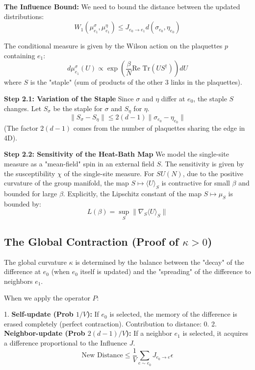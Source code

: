 \textbf{The Influence Bound:}
We need to bound the distance between the updated distributions:
\begin{equation}
W_1(\mu^\sigma_{e_1}, \mu^\eta_{e_1}) \le J_{e_0 \to e_1} d(\sigma_{e_0}, \eta_{e_0})
\end{equation}

The conditional measure is given by the Wilson action on the plaquettes $p$ containing $e_1$:
\begin{equation}
d\mu^\sigma_{e_1}(U) \propto \exp\left( \frac{\beta}{N} \text{Re Tr} (U S^\dagger) \right) dU
\end{equation}
where $S$ is the "staple" (sum of products of the other 3 links in the plaquettes).

\textbf{Step 2.1: Variation of the Staple}
Since $\sigma$ and $\eta$ differ at $e_0$, the staple $S$ changes. Let $S_\sigma$ be the staple for $\sigma$ and $S_\eta$ for $\eta$.
\begin{equation}
\| S_\sigma - S_\eta \| \le 2(d-1) \| \sigma_{e_0} - \eta_{e_0} \|
\end{equation}
(The factor $2(d-1)$ comes from the number of plaquettes sharing the edge in 4D).

\textbf{Step 2.2: Sensitivity of the Heat-Bath Map}
We model the single-site measure as a "mean-field" spin in an external field $S$. The sensitivity is given by the susceptibility $\chi$ of the single-site measure.
For $SU(N)$, due to the positive curvature of the group manifold, the map $S \mapsto \langle U \rangle_S$ is contractive for small $\beta$ and bounded for large $\beta$.
Explicitly, the Lipschitz constant of the map $S \mapsto \mu_S$ is bounded by:
\begin{equation}
L(\beta) = \sup_{S} \| \nabla_S \langle U \rangle_S \|
\end{equation}

\subsection{The Global Contraction (Proof of \texorpdfstring{$\kappa > 0$}{kappa > 0})}

The global curvature $\kappa$ is determined by the balance between the "decay" of the difference at $e_0$ (when $e_0$ itself is updated) and the "spreading" of the difference to neighbors $e_1$.

When we apply the operator $P$:

1. \textbf{Self-update (Prob $1/V$):} If $e_0$ is selected, the memory of the difference is erased completely (perfect contraction). Contribution to distance: $0$.
2. \textbf{Neighbor-update (Prob $2(d-1)/V$):} If a neighbor $e_1$ is selected, it acquires a difference proportional to the Influence $J$.
\begin{equation}
\text{New Distance} \le \frac{1}{V} \sum_{e \sim e_0} J_{e_0 \to e} \epsilon
\end{equation}

